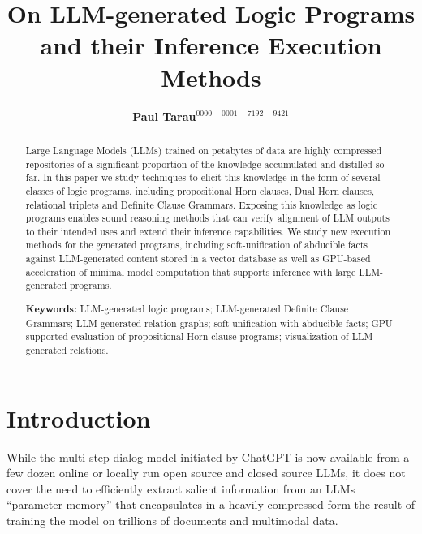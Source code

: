 \documentclass[submission,copyright,creativecommons]{eptcs}
\begin{document}
\title{
On LLM-generated Logic Programs and their Inference Execution Methods
}

\author{{\bf Paul Tarau}$^{0000-0001-7192-9421}$
}

\def \authorrunning{Paul Tarau}
\def\titlerunning{On LLM-generated Logic Programs and their Inference Execution Methods}

\date{}
\maketitle


\begin{abstract}
Large Language Models (LLMs) trained on petabytes of data are highly compressed repositories of a significant proportion of the knowledge accumulated and distilled so far.
In this paper we study techniques to elicit this knowledge in the form of several classes of logic programs, including propositional Horn clauses, Dual Horn clauses, relational triplets and Definite Clause Grammars.
Exposing this knowledge as logic programs enables sound reasoning methods that can verify alignment of LLM outputs to their intended uses and extend their inference capabilities. 
We study new execution methods for the generated programs, including soft-unification of abducible facts against LLM-generated content stored in a vector database as well as GPU-based acceleration of minimal model computation that supports  inference with large LLM-generated programs.

{\bf Keywords:}
LLM-generated logic programs;
LLM-generated Definite Clause Grammars;
LLM-generated relation graphs;
soft-unification with abducible facts;
GPU-supported evaluation of propositional Horn clause programs;
visualization of LLM-generated relations.
\end{abstract}


\section{Introduction}

While the multi-step dialog model initiated by ChatGPT is now available from  a few dozen online or locally run open source and closed source  LLMs,
it does not cover the need  to efficiently extract salient information from an LLMs ``parameter-memory'' that encapsulates in a heavily 
compressed form the result of training the model on trillions of documents and  multimodal data. 
\end{document}
